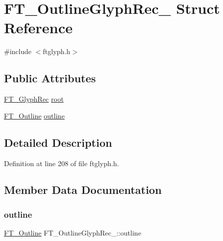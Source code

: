 \hypertarget{struct_f_t___outline_glyph_rec__}{}\section{F\+T\+\_\+\+Outline\+Glyph\+Rec\+\_\+ Struct Reference}
\label{struct_f_t___outline_glyph_rec__}


{\ttfamily \#include $<$ftglyph.\+h$>$}

\subsection*{Public Attributes}
\begin{DoxyCompactItemize}
\item 
\mbox{\hyperlink{ftglyph_8h_a095b515f46c978b33ffc9c20aad081a4}{F\+T\+\_\+\+Glyph\+Rec}} \mbox{\hyperlink{struct_f_t___outline_glyph_rec___a71e5a8d5fe69e0cea68c96486dd6713f}{root}}
\item 
\mbox{\hyperlink{ftimage_8h_a79cb182373b5aa3041955b19ce32afca}{F\+T\+\_\+\+Outline}} \mbox{\hyperlink{struct_f_t___outline_glyph_rec___af1bd473a32fcbc500edcfcf89e3ac8ac}{outline}}
\end{DoxyCompactItemize}


\subsection{Detailed Description}


Definition at line 208 of file ftglyph.\+h.



\subsection{Member Data Documentation}
\mbox{\label{struct_f_t___outline_glyph_rec___af1bd473a32fcbc500edcfcf89e3ac8ac}} 
\subsubsection{\texorpdfstring{outline}{outline}}
{\footnotesize\ttfamily \mbox{\hyperlink{ftimage_8h_a79cb182373b5aa3041955b19ce32afca}{F\+T\+\_\+\+Outline}} F\+T\+\_\+\+Outline\+Glyph\+Rec\+\_\+\+::outline}



